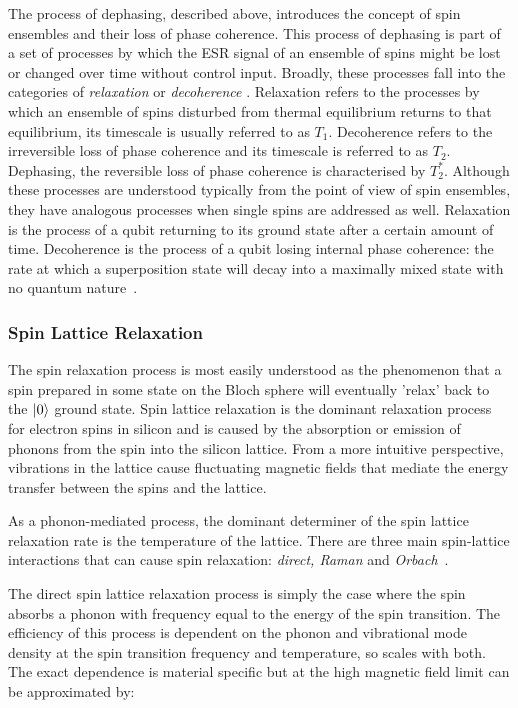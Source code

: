 The process of dephasing, described above, introduces the concept of spin ensembles and their loss of phase coherence. This process of dephasing is part of a set of processes by which the ESR signal of an ensemble of spins might be lost or changed over time without control input. Broadly, these processes fall into the categories of \emph{relaxation} or \emph{decoherence} \cite{Schweiger}. Relaxation refers to the processes by which an ensemble of spins disturbed from thermal equilibrium returns to that equilibrium, its timescale is usually referred to as $T_1$. Decoherence refers to the irreversible loss of phase coherence and its timescale is referred to as $T_2$. Dephasing, the reversible loss of phase coherence is characterised by $T_2^*$. Although these processes are understood typically from the point of view of spin ensembles, they have analogous processes when single spins are addressed as well. Relaxation is the process of a qubit returning to its ground state after a certain amount of time. Decoherence is the process of a qubit losing internal phase coherence: the rate at which a superposition state will decay into a maximally mixed state with no quantum nature~\cite{Nielsen:2011:QCQ:1972505}.

\subsubsection{Spin Lattice Relaxation}

The spin relaxation process is most easily understood as the phenomenon that a spin prepared in some state on the Bloch sphere will eventually 'relax' back to the $\ket{0}$ ground state. Spin lattice relaxation is the dominant relaxation process for electron spins in silicon and is caused by the absorption or emission of phonons from the spin into the silicon lattice. From a more intuitive perspective, vibrations in the lattice cause fluctuating magnetic fields that mediate the energy transfer between the spins and the lattice.

As a phonon-mediated process, the dominant determiner of the spin lattice relaxation rate is the temperature of the lattice. There are three main spin-lattice interactions that can cause spin relaxation: \emph{direct, Raman} and \emph{Orbach}~\cite{Schweiger,Orbach1961,Castner1962}.

The direct spin lattice relaxation process is simply the case where the spin absorbs a phonon with frequency equal to the energy of the spin transition. The efficiency of this process is dependent on the phonon and vibrational mode density at the spin transition frequency and temperature, so scales with both. The exact dependence is material specific but at the high magnetic field limit can be approximated by:

